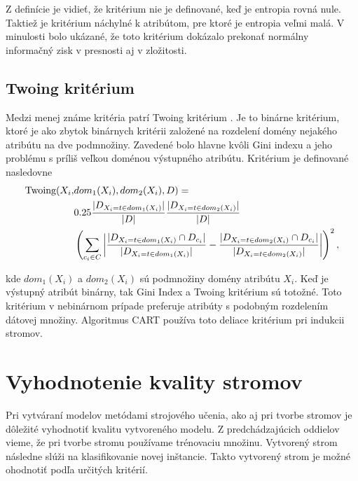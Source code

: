Z definície je vidieť, že kritérium nie je definované, keď je entropia rovná nule. Taktiež je kritérium náchylné k atribútom, pre ktoré je entropia veľmi malá. V minulosti bolo ukázané, že toto kritérium dokázalo prekonať normálny informačný zisk v presnosti aj v zložitosti.

\subsection{Twoing kritérium}\label{kap1:2.5:2.5.5:Twoing} 
Medzi menej známe kritéria patrí Twoing kritérium \cite[s.88]{kap1-DataMiningForTrees}. Je to binárne kritérium, ktoré je ako zbytok binárnych kritérii založené na rozdelení domény nejakého atribútu na dve podmnožiny. Zavedené bolo hlavne kvôli Gini indexu a jeho problému s príliš veľkou doménou výstupného atribútu. Kritérium je definované nasledovne 
\begin{align}
\mbox{Twoing}(X_{i},& dom_{1}(X_{i}),dom_{2}(X_{i}),D) = \nonumber \\
& 0.25 
\dfrac{\lvert D_{X_{i} = t \in dom_{1}(X_{i})}\lvert}{\lvert D\lvert}
\dfrac{\lvert D_{X_{i} = t \in dom_{2}(X_{i})}\lvert}{\lvert D\lvert} \nonumber \\
& \left(
\sum_{c_{i} \in C}^{}
\left| 
\dfrac{
\lvert D_{X_{i} = t \in dom_{1}(X_{i})} \cap D_{c_{i}}\lvert }{\lvert D_{X_{i} = t \in dom_{1}(X_{i})}\lvert} -
\dfrac{
\lvert D_{X_{i} = t \in dom_{2}(X_{i})} \cap D_{c_{i}}\lvert }{\lvert D_{X_{i} = t \in dom_{2}(X_{i})}\lvert}
\right|
\right)^2, \label{kap1:2.5:2.5.5:TwoingDef} 
\end{align}

kde $dom_{1}(X_{i})$ a $dom_{2}(X_{i})$ sú podmnožiny domény atribútu $X_{i}$. Keď je výstupný atribút binárny, tak Gini Index a Twoing kritérium sú totožné. Toto kritérium v nebinárnom prípade preferuje atribúty s podobným rozdelením dátovej množiny. Algoritmus CART používa toto deliace kritérium pri indukcii stromov.


\section{Vyhodnotenie kvality stromov}\label{kap1:2.6:DTEvaluation}
Pri vytváraní modelov metódami strojového učenia, ako aj pri tvorbe stromov je dôležité vyhodnotiť kvalitu vytvoreného modelu. Z predchádzajúcich oddielov vieme, že pri tvorbe stromu používame trénovaciu množinu. Vytvorený strom následne slúži na klasifikovanie novej inštancie. Takto vytvorený strom je možné ohodnotiť podľa určitých kritérií.

